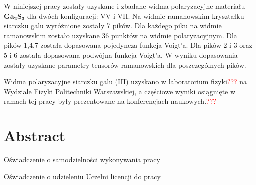 W niniejszej pracy zostały uzyskane i zbadane widma polaryzacyjne materiału $\mathbf{Ga_{2}S_{3}}$ dla dwóch konfiguracji: VV i VH. Na widmie ramanowskim kryształku siarczku galu wyróżnione zostały 7 pików. Dla każdego piku na widmie ramanowskim zostało uzyskane 36 punktów na widmie polaryzacyjnym. Dla pików 1,4,7 została dopasowana pojedyncza funkcja Voigt'a. Dla pików 2 i 3 oraz 5 i 6 została dopasowana podwójna funkcja Voigt'a. W wyniku dopasowania zostały uzyskane parametry tensorów ramanowskich dla poszczególnych pików. 

Widma polaryzacyjne siarczku galu (III) uzyskano w laboratorium fizyki\textcolor{red}{???} na Wydziale Fizyki Politechniki Warszawskiej, a częściowe wyniki osiągnięte w ramach tej pracy były prezentowane na konferencjach naukowych.\textcolor{red}{???} 

\newpage

\section*{Abstract}

\newpage

Oświadczenie o samodzielności wykonywania pracy

\newpage

Oświadczenie o udzieleniu Uczelni licencji do pracy

\newpage